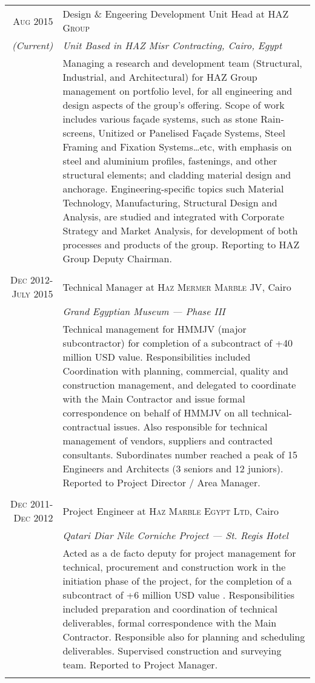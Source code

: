 \documentclass[a4paper,11pt]{article} %
\begin{document}
\begin{tabular}{r|p{11cm}}

\textsc{Aug 2015} & Design \& Engeering Development Unit Head at \textsc{HAZ Group}\\
\emph{(Current)} & \emph{Unit Based in HAZ Misr Contracting, Cairo, Egypt} \\
& \footnotesize{Managing a research and development team (Structural, Industrial, and Architectural) for HAZ Group management on portfolio level, for all engineering and design aspects of the group's offering. Scope of work includes various fa\c{c}ade systems, such as stone Rain-screens, Unitized or Panelised Fa\c{c}ade Systems, Steel Framing and Fixation Systems\ldots etc, with emphasis on steel and aluminium profiles, fastenings, and other structural elements; and cladding material design and anchorage. Engineering-specific topics such Material Technology, Manufacturing, Structural Design and Analysis, are studied and integrated with Corporate Strategy and Market Analysis, for development of both processes and products of the group. Reporting to HAZ Group Deputy Chairman.}\\
\multicolumn{2}{c}{} \\



\textsc{Dec 2012-July 2015} & Technical Manager at \textsc{Haz Mermer Marble JV}, Cairo\\
& \emph{Grand Egyptian Museum --- Phase III}\\ 
& \footnotesize{Technical management for HMMJV (major subcontractor) for completion of a subcontract of +40 million USD value. Responsibilities included Coordination with planning, commercial, quality and construction management, and delegated to coordinate with the Main Contractor and issue formal correspondence on behalf of HMMJV on all technical-contractual issues. Also responsible for technical management of vendors, suppliers and contracted consultants. Subordinates number reached a peak of 15 Engineers and Architects (3 seniors and 12 juniors). Reported to Project Director / Area Manager.}\\
\multicolumn{2}{c}{} \\


\textsc{Dec 2011-Dec 2012} & Project Engineer at \textsc{Haz Marble Egypt Ltd}, Cairo \\
& \emph{Qatari Diar Nile Corniche Project --- St. Regis Hotel} \\
& \footnotesize{Acted as a de facto deputy for project management for technical, procurement and construction work in the initiation phase of the project, for the completion of a subcontract of +6 million USD value . Responsibilities included preparation and coordination of technical deliverables, formal correspondence with the Main Contractor. Responsible also for planning and scheduling deliverables. Supervised construction and surveying team. Reported to Project Manager.}\\
\multicolumn{2}{c}{} \\


\end{tabular}
\end{document}
